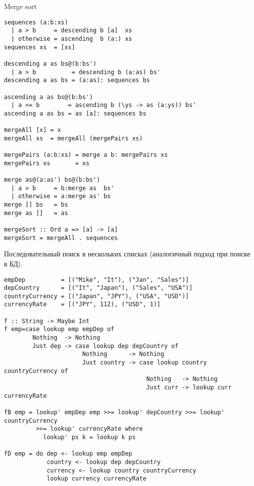 \documentclass[a4paper,10pt]{article}
\begin{document}
\lstset{language=Haskell} 
\setcounter{secnumdepth}{0}
Merge sort
\begin{lstlisting}
sequences (a:b:xs)
  | a > b     = descending b [a]  xs
  | otherwise = ascending  b (a:) xs
sequences xs  = [xs]

descending a as bs@(b:bs')
  | a > b          = descending b (a:as) bs'
descending a as bs = (a:as): sequences bs

ascending a as bs@(b:bs')
  | a <= b        = ascending b (\ys -> as (a:ys)) bs'
ascending a as bs = as [a]: sequences bs

mergeAll [x] = x
mergeAll xs  = mergeAll (mergePairs xs)

mergePairs (a:b:xs) = merge a b: mergePairs xs
mergePairs xs       = xs

merge as@(a:as') bs@(b:bs')
  | a > b     = b:merge as  bs'
  | otherwise = a:merge as' bs
merge [] bs   = bs
merge as []   = as

mergeSort :: Ord a => [a] -> [a]
mergeSort = mergeAll . sequences

\end{lstlisting}

Последовательный поиск в нескольких списках (аналогичный подход при поиске в БД).
\begin{lstlisting}
empDep          = [("Mike", "It"), ("Jan", "Sales")]
depCountry      = [("It", "Japan"), ("Sales", "USA")]
countryCurrency = [("Japan", "JPY"), ("USA", "USD")]
currencyRate    = [("JPY", 112), ("USD", 1)]

f :: String -> Maybe Int
f emp=case lookup emp empDep of
        Nothing  -> Nothing
        Just dep -> case lookup dep depCountry of
                      Nothing      -> Nothing
                      Just country -> case lookup country countryCurrency of
                                        Nothing   -> Nothing
                                        Just curr -> lookup curr currencyRate

fB emp = lookup' empDep emp >>= lookup' depCountry >>= lookup' countryCurrency
         >>= lookup' currencyRate where
           lookup' ps k = lookup k ps

fD emp = do dep <- lookup emp empDep
            country <- lookup dep depCountry
            currency <- lookup country countryCurrency
            lookup currency currencyRate
\end{lstlisting}
\end{document}
